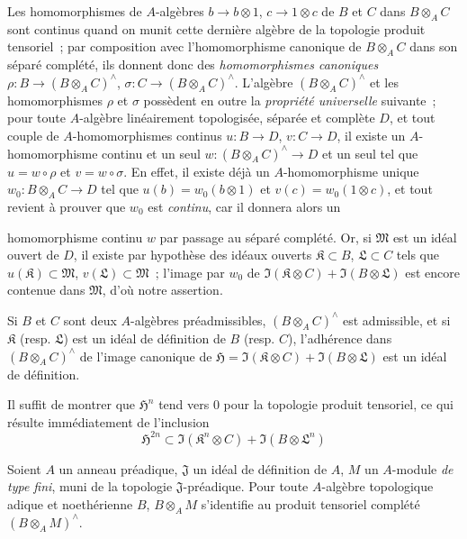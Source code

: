 \begin{env}[7.7.6]
\label{0.7.7.6-fr}
Les homomorphismes de $A$-algèbres $b\to b\otimes 1$,
$c\to 1\otimes c$ de $B$ et $C$ dans $B\otimes_A C$ sont continus
quand on munit cette dernière algèbre de la topologie produit tensoriel~;
par composition avec l'homomorphisme canonique de $B\otimes_A C$ dans son
séparé complété, ils donnent donc des \emph{homomorphismes canoniques}
$\rho:B\to(B\otimes_A C)^\wedge$, $\sigma:C\to(B\otimes_A C)^\wedge$.
L'algèbre $(B\otimes_A C)^\wedge$ et les homomorphismes $\rho$ et $\sigma$
possèdent en outre la \emph{propriété universelle} suivante~; pour toute
$A$-algèbre linéairement topologisée, séparée et complète $D$, et tout
couple de $A$-homomorphismes continus $u:B\to D$, $v:C\to D$, il existe un
$A$-homomorphisme continu et un seul
$w:(B\otimes_A C)^\wedge\to D$ et un seul tel que $u=w\circ\rho$ et
$v=w\circ\sigma$. En effet, il existe déjà un $A$-homomorphisme unique
$w_0:B\otimes_A C\to D$ tel que $u(b)=w_0(b\otimes 1)$ et
$v(c)=w_0(1\otimes c)$, et tout revient à prouver que $w_0$ est \emph{continu},
car il donnera alors un


homomorphisme continu $w$ par passage au séparé complété. Or, si
$\mathfrak M$ est un idéal ouvert de $D$, il existe par hypothèse des idéaux
ouverts $\mathfrak K\subset B$, $\mathfrak L\subset C$ tels que
$u(\mathfrak K)\subset\mathfrak M$, $v(\mathfrak L)\subset\mathfrak M$~;
l'image par $w_0$ de
$\Im(\mathfrak K\otimes C)+\Im(B\otimes\mathfrak L)$ est encore
contenue dans $\mathfrak M$, d'où notre assertion.
\end{env}

\begin{proposition}[7.7.7]
\label{0.7.7.7-fr}
Si $B$ et $C$ sont deux $A$-algèbres préadmissibles,
$(B\otimes_A C)^\wedge$ est admissible, et si $\mathfrak K$ \textup{(resp.
$\mathfrak L$)} est un idéal de définition de $B$ \textup{(resp. $C$)}, l'adhérence
dans $(B\otimes_A C)^\wedge$ de l'image canonique de
$\mathfrak H=\Im(\mathfrak K\otimes C)+\Im(B\otimes\mathfrak L)$ est
un idéal de définition.
\end{proposition}

Il suffit de montrer que $\mathfrak H^n$ tend vers $0$ pour la topologie
produit tensoriel, ce qui résulte immédiatement de l'inclusion
\[
  \mathfrak H^{2n}\subset
  \Im(\mathfrak K^n\otimes C)+\Im(B\otimes\mathfrak L^n)
\]

\begin{proposition}[7.7.8]
\label{0.7.7.8-fr}
Soient $A$ un anneau préadique, $\mathfrak J$ un idéal de définition de
$A$, $M$ un $A$-module \emph{de type fini}, muni de la topologie
$\mathfrak J$-préadique. Pour toute $A$-algèbre topologique adique et
noethérienne $B$, $B\otimes_A M$ s'identifie au produit tensoriel complété
$(B\otimes_A M)^\wedge$.
\end{proposition}

